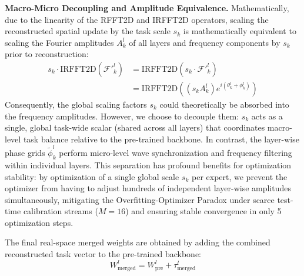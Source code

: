 \textbf{Macro-Micro Decoupling and Amplitude Equivalence.} Mathematically, due to the linearity of the RFFT2D and IRFFT2D operators, scaling the reconstructed spatial update by the task scale $s_k$ is mathematically equivalent to scaling the Fourier amplitudes $A_k^l$ of all layers and frequency components by $s_k$ prior to reconstruction:
\begin{align}
    s_k \cdot \text{IRFFT2D}\left(\mathcal{F}'^l_k\right) &= \text{IRFFT2D}\left(s_k \cdot \mathcal{F}'^l_k\right) \nonumber \\
    &= \text{IRFFT2D}\left((s_k A_k^l) e^{i(\theta_k^l + \phi_k^l)}\right)
\end{align}
Consequently, the global scaling factors $s_k$ could theoretically be absorbed into the frequency amplitudes. However, we choose to decouple them: $s_k$ acts as a single, global task-wide scalar (shared across all layers) that coordinates macro-level task balance relative to the pre-trained backbone. In contrast, the layer-wise phase grids $\tilde{\phi}_k^l$ perform micro-level wave synchronization and frequency filtering within individual layers. This separation has profound benefits for optimization stability: by optimization of a single global scale $s_k$ per expert, we prevent the optimizer from having to adjust hundreds of independent layer-wise amplitudes simultaneously, mitigating the Overfitting-Optimizer Paradox under scarce test-time calibration streams ($M=16$) and ensuring stable convergence in only 5 optimization steps.

The final real-space merged weights are obtained by adding the combined reconstructed task vector to the pre-trained backbone:
\begin{equation}
    W^l_{\text{merged}} = W^l_{\text{pre}} + \tau^l_{\text{merged}}
\end{equation}

